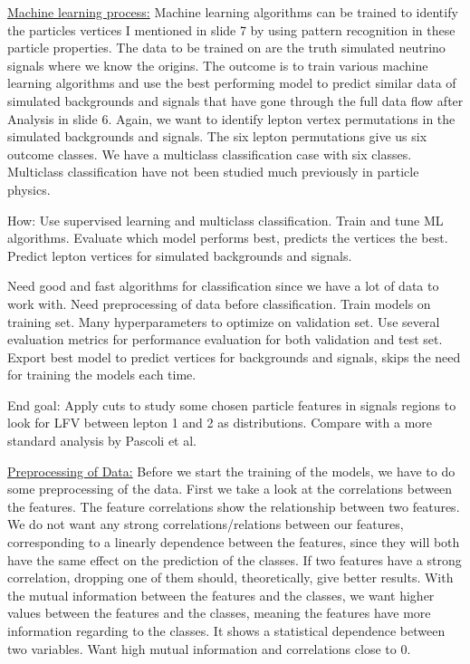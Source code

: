 \documentclass[a4paper, american, 12pt]{report}
\begin{document}
	
	\underline{Machine learning process:}
	Machine learning algorithms can be trained to identify the particles vertices I mentioned in slide 7 by using pattern recognition in these particle properties. The data to be trained on are the truth simulated neutrino signals where we know the origins. The outcome is to train various machine learning algorithms and use the best performing model to predict similar data of simulated backgrounds and signals that have gone through the full data flow after Analysis in slide 6. Again, we want to identify lepton vertex permutations in the simulated backgrounds and signals. The six lepton permutations give us six outcome classes. We have a multiclass classification case with six classes. Multiclass classification have not been studied much previously in particle physics. 
	
	How: Use supervised learning and multiclass classification. Train and tune ML algorithms. Evaluate which model performs best, predicts the vertices the best. Predict lepton vertices for simulated backgrounds and signals.
	
	Need good and fast algorithms for classification since we have a lot of data to work with. Need preprocessing of data before classification. Train models on training set. Many hyperparameters to optimize on validation set. Use several evaluation metrics for performance evaluation for both validation and test set. Export best model to predict vertices for backgrounds and signals, skips the need for training the models each time.
	
	End goal: Apply cuts to study some chosen particle features in signals regions to look for LFV between lepton 1 and 2 as distributions. Compare with a more standard analysis by Pascoli et al.
	
	
	\underline{Preprocessing of Data:}
	Before we start the training of the models, we have to do some preprocessing of the data. First we take a look at the correlations between the features. The feature correlations show the relationship between two features. We do not want any strong correlations/relations between our features, corresponding to a linearly dependence between the features, since they will both have the same effect on the prediction of the classes. If two features have a strong correlation, dropping one of them should, theoretically, give better results. 
	With the mutual information between the features and the classes, we want higher values between the features and the classes, meaning the features have more information regarding to the classes. It shows a statistical dependence between two variables. Want high mutual information and correlations close to 0.
	
\end{document}
